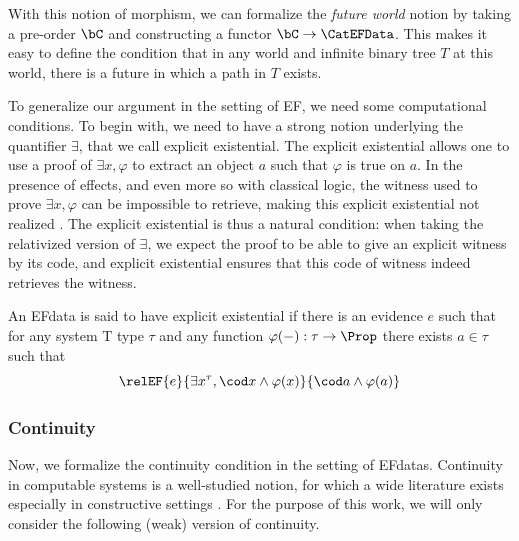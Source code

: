 With this notion of morphism, we can formalize the \emph{future world} notion by taking
a pre-order $\bC$ and constructing a functor $\bC \to \CatEFData$.
This makes it easy to define the condition that in any world and infinite binary tree $T$
at this world, there is a future in which a path in $T$ exists.


To generalize our argument in the setting of EF, we need some computational conditions. To begin with, we need to
have a strong notion underlying the quantifier $\exists$, that we call explicit existential. The explicit existential allows one to use a proof of $\exists x, \varphi$ to extract an object $a$ such that $\varphi$ is true on $a$. In the presence of effects, and even more so with classical logic,
the witness used to prove $\exists x, \varphi$ can be impossible to retrieve, making
this explicit existential not realized \cite{Herbelin05}.
The explicit existential is thus a natural condition: when taking the relativized version of $\exists$, we expect the proof to be able to give an explicit witness by its code, and explicit existential ensures that this code of witness indeed retrieves the witness.
\begin{definition}
  An EFdata is said to have explicit existential if there is an evidence $e$ such that for any system T type $\tau$ and any function $\varphi(-) : \tau \to \Prop$ there exists $a \in \tau$ such that
  \[\relEF{e}{\exists x^\tau, \cod x \land \varphi(x)}{\cod a \land \varphi(a)}\]
\end{definition}


\subsubsection{Continuity}
Now, we formalize the continuity condition in the setting of EFdatas.
Continuity in computable systems is a well-studied notion, for which a wide literature exists especially
in constructive settings \cite{these_baillon}.
For the purpose of this work, we will only consider the following (weak) version of continuity.

